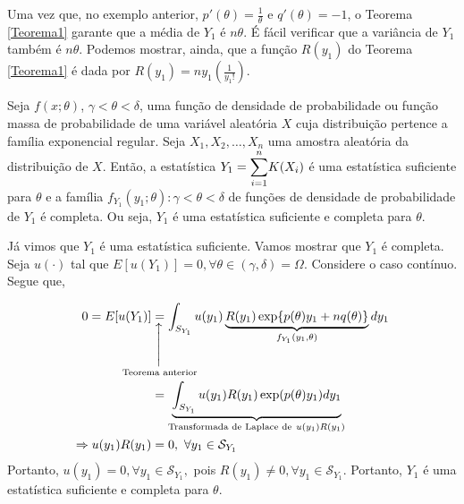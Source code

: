 \documentclass[12pt]{beamer}
\begin{document}
\begin{frame}{}
\begin{block}{}
\justifying
Uma vez que, no exemplo anterior, $p'(\theta) = \frac{1}{\theta}$ e $q'(\theta) = -1$, o Teorema \ref{Teorema1} garante que a média de $Y_1$ é $n\theta$. É fácil verificar que a variância de $Y_1$ também é $n\theta$. Podemos mostrar, ainda, que a função $R(y_1)$ do Teorema \ref{Teorema1} é dada por $R(y_1) = ny_1\left(\frac{1}{y_1!}\right)$.
\end{block}
\end{frame}

\begin{frame}{}
\begin{Teorema}
\justifying
Seja $f(x; \theta)$, $\gamma < \theta < \delta$, uma função de densidade de probabilidade ou função massa de probabilidade de uma variável aleatória $X$ cuja distribuição pertence a família exponencial regular. Seja $X_1,X_2, \ldots,X_n$ uma amostra aleatória da distribuição de $X.$ Então, a estatística $Y_1 = {\displaystyle \sum_{i=1}^{n}} K(X_i)$ é uma estatística suficiente para $\theta$ e a família ${f_{Y_1}(y_1; \theta) : \gamma < \theta < \delta}$ de funções de densidade de probabilidade de $Y_1$ é completa. Ou seja, $Y_1$ é uma estatística suficiente e completa para $\theta$.
\end{Teorema}
\end{frame}

\begin{frame}{}
\begin{block}{}
\justifying
Já vimos que $Y_1$ é uma estatística suficiente. Vamos mostrar que $Y_{1}$ é completa. Seja $u(\cdot)$ tal que $E[u(Y_1)] = 0, \forall \theta\in (\gamma, \delta)=\Omega.$ Considere o caso contínuo. Segue que, 

\begin{align*}
0=E[u(Y_1)]&\SetaUP{\text{Teorema anterior}}{=}
\int_{S_{Y_1}} u(y_1)\underbrace{R(y_1) \exp\{p(\theta)y_1 + nq(\theta)\}}_{f_{Y_{1}}(y_{1},\theta)} dy_1\\
&=\underbrace{\int_{S_{Y_1}} u(y_1)R(y_1) \exp(p(\theta)y_1) dy_1}_{\text{Transformada de Laplace de}~u(y_{1})R(y_{1})}\\
\Rightarrow u(y_{1})R(y_{1})&=0,~\forall y_{1}\in \mathcal{S}_{Y_{1}}
\end{align*}
Portanto, $u(y_1) = 0, \forall y_{1}\in \mathcal{S}_{Y_{1}},$ pois $R(y_{1})\neq 0, \forall y_{1}\in \mathcal{S}_{Y_{1}}$. Portanto, $Y_1$ é uma estatística suficiente e completa para $\theta$.

\end{block}
\end{frame}
\end{document}
